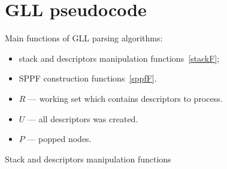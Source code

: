 \appendix

\section{GLL pseudocode}\label{GLLCode}

Main functions of GLL parsing algorithms: 
\begin{itemize}
\item stack and descriptors manipulation functions~\ref{stackF};
\item SPPF construction functions~\ref{sppfF}.
\end{itemize}

\begin{itemize}
\item $R$ --- working set which contains descriptors to process.
\item $U$ --- all descriptors was created.
\item $P$ --- popped nodes.
\end{itemize}


\begin{algorithm}
\begin{algorithmic}[1]
\caption{Stack and descriptors manipulation functions}
\label{stackF}
  \EndIf
\EndFunction

      \EndFor
  \EndIf
\EndFunction

  \EndIf
      \EndFor
  \EndIf
\EndFunction

\end{algorithmic}
\end{algorithm}


